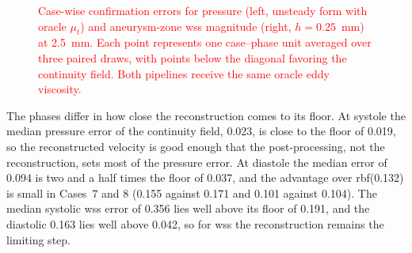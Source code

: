 \documentclass[12pt,a4paper]{article}
\newcommand{\WSS}{\ac{wss}\xspace}
\newcommand{\RBF}{\ac{rbf}\xspace}
\theoremstyle{definition}
\numberwithin{equation}{section}
\newcommand{\revision}[1]{\textcolor{red}{#1}}
\begin{document}
\begin{figure}[!htb]
\centering
\begin{minipage}{0.48\textwidth}
\centering
{}
\end{minipage}
\hfill
\begin{minipage}{0.48\textwidth}
\centering
{}
\end{minipage}
\caption{\revision{Case-wise confirmation errors for pressure (left, unsteady form with oracle $\mu_t$) and aneurysm-zone \WSS magnitude (right, $h=0.25$~mm) at 2.5~mm. Each point represents one case--phase unit averaged over three paired draws, with points below the diagonal favoring the continuity field. Both pipelines receive the same oracle eddy viscosity.}}
\label{fig:confirmation}
\end{figure}

The phases differ in how close the reconstruction comes to its floor. At systole the median pressure error of the continuity field, 0.023, is close to the floor of 0.019, so the reconstructed velocity is good enough that the post-processing, not the reconstruction, sets most of the pressure error. At diastole the median error of 0.094 is two and a half times the floor of 0.037, and the advantage over \RBF (0.132) is small in Cases~7 and 8 (0.155 against 0.171 and 0.101 against 0.104). The median systolic \WSS error of 0.356 lies well above its floor of 0.191, and the diastolic 0.163 lies well above 0.042, so for \WSS the reconstruction remains the limiting step.
\end{document}

